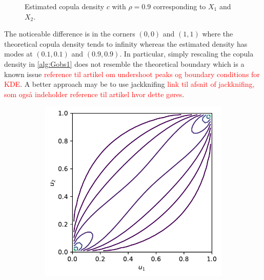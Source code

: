 \documentclass[../Thesis.tex]{subfiles}
\begin{document}
\begin{figure}[H]
\begin{subfigure}[t]{0.5\linewidth}
        \caption{}
    \end{subfigure}
    \caption{Estimated copula density $c$ with $\rho = 0.9$ corresponding to $X_1$ and $X_2$.}
    \label{fig:gaussian copula estimate}
\end{figure}
The noticeable difference is in the corners $(0,0)$ and $(1,1)$ where the theoretical copula density tends to infinity whereas the estimated density has modes at $(0.1,0.1)$ and $(0.9,0.9)$. In particular, simply rescaling the copula density in \autoref{alg:Gobs1} does not resemble the theoretical boundary which is a known issue \textcolor{red}{reference til artikel om undershoot peaks og boundary conditions for KDE}. A better approach may be to use jackknifing \textcolor{red}{link til afsnit of jackknifing, som også indeholder reference til artikel hvor dette gøres}.
\begin{figure}[H]
    \centering
    \begin{subfigure}[t]{0.45\linewidth}
        \centering
        \includegraphics[width = \linewidth]{figures/ND examples/Gaussian copula theoretical contour.pdf}
        \caption{}
    \end{subfigure}%
    ~
    \begin{subfigure}[t]{0.5\linewidth}

\end{subfigure}
\end{figure}
\end{document}
